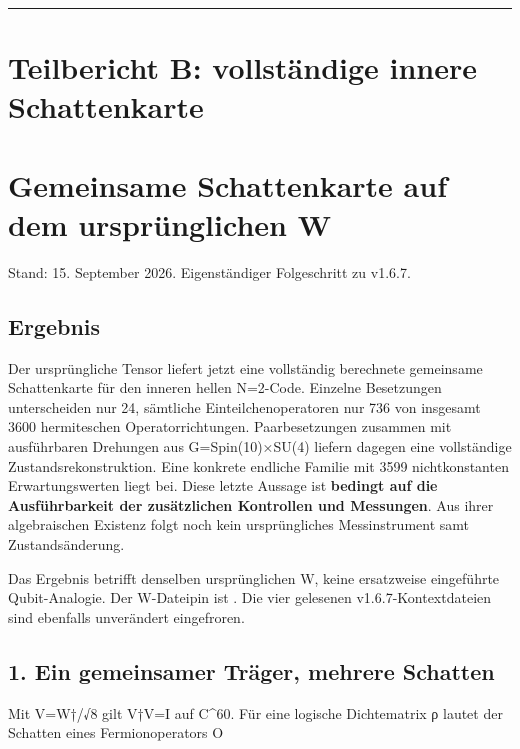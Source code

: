 \begin{center}\rule{0.5\linewidth}{0.5pt}\end{center}

\section{Teilbericht B: vollständige innere
Schattenkarte}\label{teilbericht-b-vollstuxe4ndige-innere-schattenkarte}

\section{Gemeinsame Schattenkarte auf dem ursprünglichen
W}\label{gemeinsame-schattenkarte-auf-dem-urspruxfcnglichen-w}

Stand: 15. September 2026. Eigenständiger Folgeschritt zu v1.6.7.

\subsection{Ergebnis}\label{ergebnis-1}

Der ursprüngliche Tensor liefert jetzt eine vollständig berechnete
gemeinsame Schattenkarte für den inneren hellen N=2-Code. Einzelne
Besetzungen unterscheiden nur 24, sämtliche Einteilchenoperatoren nur
736 von insgesamt 3600 hermiteschen Operatorrichtungen. Paarbesetzungen
zusammen mit ausführbaren Drehungen aus G=Spin(10)×SU(4) liefern dagegen
eine vollständige Zustandsrekonstruktion. Eine konkrete endliche Familie
mit 3599 nichtkonstanten Erwartungswerten liegt bei. Diese letzte
Aussage ist \textbf{bedingt auf die Ausführbarkeit der zusätzlichen
Kontrollen und Messungen}. Aus ihrer algebraischen Existenz folgt noch
kein ursprüngliches Messinstrument samt Zustandsänderung.

Das Ergebnis betrifft denselben ursprünglichen W, keine ersatzweise
eingeführte Qubit-Analogie. Der W-Dateipin ist
.
Die vier gelesenen v1.6.7-Kontextdateien sind ebenfalls unverändert
eingefroren.

\subsection{1. Ein gemeinsamer Träger, mehrere
Schatten}\label{ein-gemeinsamer-truxe4ger-mehrere-schatten}

Mit V=W†/√8 gilt V†V=I auf C\^{}60. Für eine logische Dichtematrix ρ
lautet der Schatten eines Fermionoperators O

